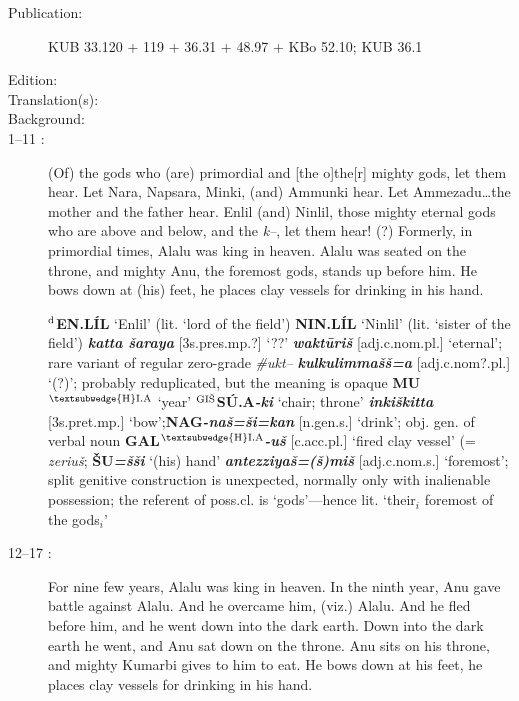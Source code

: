 \documentclass[10pt]{article}
\newcommand{\supersc}[1]{$^{\textrm{\scriptsize{#1}}}$}  	%
\newcommand{\bit}[1]{\textbf{\textit{#1}}}				%
\newcommand{\p}[1]{{\tiny[{#1}]}}					%
\newcommand{\hith}{\textsubwedge{h}}
\newcommand{\Hith}{\textsubwedge{H}}
\newcommand{\hpl}{\supersc{{\Hith}I.A}}
\newcommand{\wood}{\supersc{GI\v{S}}}
\renewcommand{\.}[1]{\textsubdot{#1}}
\begin{document}
\begin{description}

\item[Publication:] KUB 33.120 + 119 + 36.31 + 48.97 + KBo 52.10; KUB 36.1
\item[Edition:]
\item[Translation(s):] 
\item[Background:] 

\item[1--11 :] (Of) the gods who (are) primordial and [the o]the[r] mighty gods, let them hear. Let Nara, Napsara, Minki, (and) Ammunki hear. Let Ammezadu{\ldots}the mother and the father hear. Enlil (and) Ninlil, those mighty eternal gods who are above and below, and the \textit{k--},  let them hear! (?) Formerly, in primordial times, Alalu was king in heaven. Alalu was seated on the throne, and mighty Anu, the foremost gods, stands up before him. He bows down at (his) feet, he places clay vessels for drinking in his hand.



\begin{notes}

\textbf{\supersc{d}EN.L\'IL} `Enlil' (lit. `lord of the field') \textbf{NIN.L\'IL} `Ninlil' (lit. `sister of the field') \bit{katta \v{s}araya} \p{3s.pres.mp.?} `??' \bit{wakt\=uri\v{s}} \p{adj.c.nom.pl.} `eternal'; rare variant of regular zero-grade \textit{\#ukt--} \bit{kulkulimma\v{s}\v{s}=a} \p{adj.c.nom?.pl.} `(?)'; probably reduplicated, but the meaning is opaque \textbf{MU\hpl} `year' \textbf{{\wood}S\'U.A}\bit{-ki} `chair; throne' \bit{{\hith}inki\v{s}kitta} \p{3s.pret.mp.} `bow';\textbf{NAG}\bit{-na\v{s}=\v{s}i=kan} \p{n.gen.s.} `drink'; obj. gen. of verbal noun \textbf{GAL\hpl}\bit{-u\v{s}} \p{c.acc.pl.} `fired clay vessel' (= \textit{zeriu\v{s}}; \textbf{\v{S}U}\bit{=\v{s}\v{s}i} `(his) hand' \bit{{\hith}antezziya\v{s}=(\v{s})mi\v{s}} \p{adj.c.nom.s.} `foremost'; split genitive construction is unexpected, normally only with inalienable possession; the referent of poss.cl. is `gods'---hence lit. `their$_i$ foremost of the gods$_i$' 


\end{notes}

\item[12--17 :] For nine few years, Alalu was king in heaven. In the ninth year, Anu gave battle against Alalu. And he overcame him, (viz.) Alalu. And he fled before him, and he went down into the dark earth. Down into the dark earth he went, and Anu sat down on the throne. Anu sits on his throne, and mighty Kumarbi gives to him to eat. He bows down at his feet, he places clay vessels for drinking in his hand.


\end{description}
\end{document}
